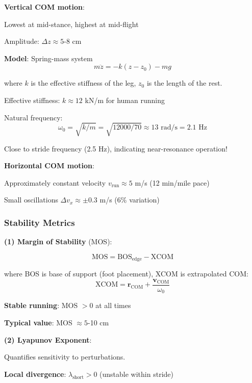 \documentclass[11pt,onecolumn]{article}
\begin{document}
\textbf{Vertical COM motion}:

Lowest at mid-stance, highest at mid-flight

Amplitude: $\Delta z \approx 5$-8 cm

\textbf{Model}: Spring-mass system
\begin{equation}
m\ddot{z} = -k(z - z_0) - mg
\end{equation}

where $k$ is the effective stiffness of the leg, $z_0$ is the length of the rest.

Effective stiffness: $k \approx 12$ kN/m for human running

Natural frequency:
\begin{equation}
\omega_0 = \sqrt{k/m} = \sqrt{12000/70} \approx 13 \text{ rad/s} = 2.1 \text{ Hz}
\end{equation}

Close to stride frequency (2.5 Hz), indicating near-resonance operation!

\textbf{Horizontal COM motion}:

Approximately constant velocity $v_{\text{run}} \approx 5$ m/s (12 min/mile pace)

Small oscillations $\Delta v_x \approx \pm 0.3$ m/s (6\% variation)

\subsubsection{Stability Metrics}

\textbf{(1) Margin of Stability} (MOS):

\begin{equation}
\text{MOS} = \text{BOS}_{\text{edge}} - \text{XCOM}
\end{equation}

where BOS is base of support (foot placement), XCOM is extrapolated COM:
\begin{equation}
\text{XCOM} = \mathbf{r}_{\text{COM}} + \frac{\mathbf{v}_{\text{COM}}}{\omega_0}
\end{equation}

\textbf{Stable running}: MOS $> 0$ at all times

\textbf{Typical value}: MOS $\approx 5$-10 cm

\textbf{(2) Lyapunov Exponent}:

Quantifies sensitivity to perturbations.

\textbf{Local divergence}: $\lambda_{\text{short}} > 0$ (unstable within stride)
\end{document}
